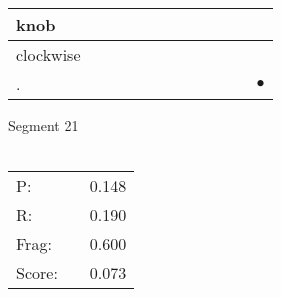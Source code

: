 \documentclass[landscape]{article}
\newcommand{\ssp}{\hspace{2pt}}
\newcommand{\mex}{\cellcolor{g}$\bullet$}
\begin{document}
\begin{tabular}{|l|p{10pt}|p{10pt}|p{10pt}|p{10pt}|p{10pt}|p{10pt}|p{10pt}|p{10pt}|p{10pt}|p{10pt}|p{10pt}|}
\hline
\ssp knob \ssp&\hspace{2pt}&\hspace{2pt}&\hspace{2pt}&\hspace{2pt}&\hspace{2pt}&\hspace{2pt}&\hspace{2pt}&\hspace{2pt}&\hspace{2pt}&\hspace{2pt}&\hspace{2pt}\\
\hline
\ssp clockwise \ssp&\hspace{2pt}&\hspace{2pt}&\hspace{2pt}&\hspace{2pt}&\hspace{2pt}&\hspace{2pt}&\hspace{2pt}&\hspace{2pt}&\hspace{2pt}&\hspace{2pt}&\hspace{2pt}\\
\hline
\ssp \cellcolor{ref10}. \ssp&\hspace{2pt}&\hspace{2pt}&\hspace{2pt}&\hspace{2pt}&\hspace{2pt}&\hspace{2pt}&\hspace{2pt}&\hspace{2pt}&\hspace{2pt}&\hspace{2pt}&\hspace{2pt}\mex\\
\hline
\end{tabular}

\vspace{6pt}
\noindent Segment 21\\\\
\noindent\begin{tabular}{lm{12pt}r}
\hline
P:&&0.148\\
R:&&0.190\\
Frag:&&0.600\\
Score:&&0.073\\
\end{tabular}
\end{document}
